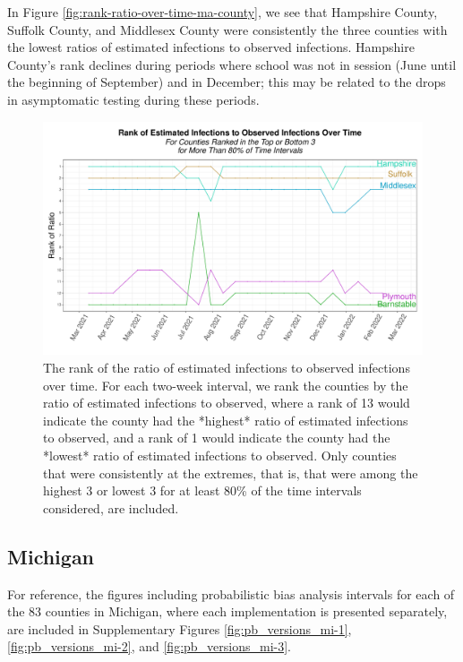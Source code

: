 \documentclass[12pt,twoside]{smiththesis}
\begin{document}
In Figure \ref{fig:rank-ratio-over-time-ma-county}, we see that Hampshire County, Suffolk County, and Middlesex County were consistently the three counties with the lowest ratios of estimated infections to observed infections. Hampshire County's rank declines during periods where school was not in session (June until the beginning of September) and in December; this may be related to the drops in asymptomatic testing during these periods.
\begin{figure}
\includegraphics[width=1\linewidth]{figure/rank-ratio-over-time-ma-county} \caption{\label{fig:rank-ratio-over-time-ma-county}The rank of the ratio of estimated infections to observed infections over time. For each two-week interval, we rank the counties by the ratio of estimated infections to observed, where a rank of 13 would indicate the county had the *highest* ratio of estimated infections to observed, and a rank of 1   would indicate the county had the *lowest* ratio of estimated infections to observed. Only counties that were consistently at the extremes, that is, that were among the highest 3 or lowest 3 for at least 80\% of the time intervals considered, are included.}\label{fig:unnamed-chunk-95}
\end{figure}
\hypertarget{michigan}{%
\subsection{Michigan}\label{michigan}}

For reference, the figures including probabilistic bias analysis intervals for each of the 83 counties in Michigan, where each implementation is presented separately, are included in Supplementary Figures \ref{fig:pb_versions_mi-1}, \ref{fig:pb_versions_mi-2}, and \ref{fig:pb_versions_mi-3}.
\end{document}
